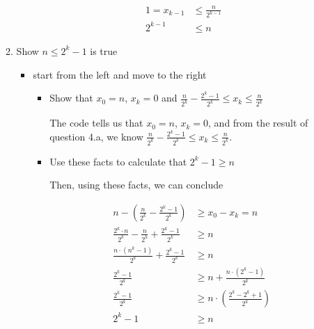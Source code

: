 \documentclass[12pt]{article}
\begin{document}
\begin{enumerate}[a.]
\begin{mdframed}
\begin{enumerate}[1.]
\begin{itemize}
\begin{mdframed}
                    \bigskip

                    \begin{align}
                        1 = x_{k-1} &\leq \frac{n}{2^{k-1}}\\
                        2^{k-1} &\leq n
                    \end{align}
                \end{mdframed}

            \end{itemize}

            \item Show $n \leq 2^k - 1$ is true

            \begin{itemize}
                \item start from the left and move to the right

                \begin{itemize}
                    \item Show that $x_0 = n$, $x_k = 0$ and $\frac{n}{2^k} - \frac{2^k - 1}{2^k} \leq x_k \leq \frac{n}{2^k}$

                    \begin{mdframed}
                    The code tells us that $x_0 = n$, $x_k = 0$, and from the result of question 4.a,
                    we know $\frac{n}{2^k} - \frac{2^k - 1}{2^k} \leq x_k \leq \frac{n}{2^k}$.
                    \end{mdframed}

                    \item Use these facts to calculate that $2^k - 1 \geq n$

                    \begin{mdframed}
                    Then, using these facts, we can conclude

                    \begin{align}
                        n - \left( \frac{n}{2^k} - \frac{2^k - 1}{2^k} \right) &\geq x_0 - x_k = n\\
                        \frac{2^k \cdot n}{2^k} - \frac{n}{2^k} + \frac{2^k -1}{2^k} &\geq n\\
                        \frac{n \cdot (n^k - 1)}{2^k} + \frac{2^k -1}{2^k} &\geq n\\
                        \frac{2^k -1}{2^k} &\geq n + \frac{n \cdot (2^k - 1)}{2^k}\\
                        \frac{2^k -1}{2^k} &\geq n \cdot \left(\frac{2^k - 2^k + 1}{2^k} \right)\\
                        2^k - 1 &\geq n
                    \end{align}
                    \end{mdframed}
                \end{itemize}
            \end{itemize}


\end{enumerate}
\end{mdframed}
\end{enumerate}
\end{document}
